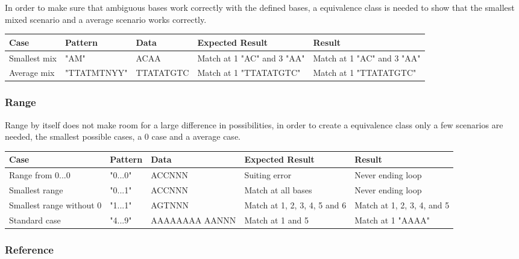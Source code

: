 \documentclass[12pt]{article}
\begin{document}
In order to make sure that ambiguous bases work correctly with the defined bases, a equivalence class is needed
to show that the smallest mixed scenario and a average scenario works correctly.
\begin{table}[H]
\begin{tabular}{p{4cm}|p{3.6cm}|p{2.5cm}|p{2.2cm}|p{2.2cm}}
Case 			& Pattern & Data & Expected Result & Result \\ \hline
\rowcolor{lightgreen}
Smallest mix		& "AM" & ACAA & Match at 1 "AC" and 3 "AA" & Match at 1 "AC" and 3 "AA" \\ \hline
\rowcolor{lightgreen}
Average mix		& "TTATMTNYY" & TTATATGTC & Match at 1 "TTATATGTC" & Match at 1 "TTATATGTC"
\end{tabular}
\end{table}


\subsubsection{Range}
Range by itself does not make room for a large difference in possibilities, in order to create a 
equivalence class only a few scenarios are needed, the smallest possible cases, a 0 case and a average case.
\begin{table}[H]
\begin{tabular}{p{4cm}|p{3cm}|p{2.5cm}|p{2.5cm}|p{2.5cm}}
Case 			& Pattern & Data & Expected Result & Result \\ \hline
\rowcolor{lightred}
Range from 0...0	& "0...0" & ACCNNN & Suiting error & Never ending loop \\ \hline
\rowcolor{lightred}
Smallest range 	& "0...1" & ACCNNN & Match at all bases & Never ending loop \\ \hline
\rowcolor{lightgreen}
Smallest range without 0 & "1...1" & AGTNNN & Match at 1, 2, 3, 4, 5 and 6 & Match at 1, 2, 3, 4, and 5 \\ \hline
\rowcolor{lightgreen}
Standard case	& "4...9" & AAAAAAAA AANNN & Match at 1 and 5 & Match at 1 "AAAA"
\end{tabular}
\end{table} 



\subsubsection{Reference}
\end{document}
